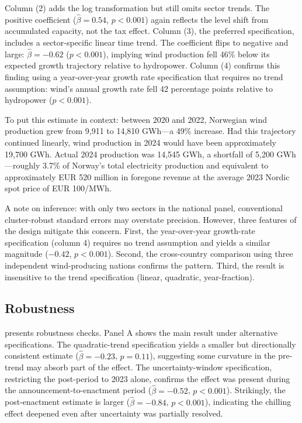 \documentclass[12pt]{article}
\begin{document}
Column (2) adds the log transformation but still omits sector trends. The positive coefficient ($\hat{\beta} = 0.54$, $p < 0.001$) again reflects the level shift from accumulated capacity, not the tax effect. Column (3), the preferred specification, includes a sector-specific linear time trend. The coefficient flips to negative and large: $\hat{\beta} = -0.62$ ($p < 0.001$), implying wind production fell 46\% below its expected growth trajectory relative to hydropower. Column (4) confirms this finding using a year-over-year growth rate specification that requires no trend assumption: wind's annual growth rate fell 42 percentage points relative to hydropower ($p < 0.001$).

To put this estimate in context: between 2020 and 2022, Norwegian wind production grew from 9,911 to 14,810 GWh---a 49\% increase. Had this trajectory continued linearly, wind production in 2024 would have been approximately 19,700 GWh. Actual 2024 production was 14,545 GWh, a shortfall of 5,200 GWh---roughly 3.7\% of Norway's total electricity production and equivalent to approximately EUR 520 million in foregone revenue at the average 2023 Nordic spot price of EUR 100/MWh.

A note on inference: with only two sectors in the national panel, conventional cluster-robust standard errors may overstate precision. However, three features of the design mitigate this concern. First, the year-over-year growth-rate specification (column 4) requires no trend assumption and yields a similar magnitude ($-0.42$, $p < 0.001$). Second, the cross-country comparison using three independent wind-producing nations confirms the pattern. Third, the result is insensitive to the trend specification (linear, quadratic, year-fraction).

\subsection{Robustness}



 presents robustness checks. Panel A shows the main result under alternative specifications. The quadratic-trend specification yields a smaller but directionally consistent estimate ($\hat{\beta} = -0.23$, $p = 0.11$), suggesting some curvature in the pre-trend may absorb part of the effect. The uncertainty-window specification, restricting the post-period to 2023 alone, confirms the effect was present during the announcement-to-enactment period ($\hat{\beta} = -0.52$, $p < 0.001$). Strikingly, the post-enactment estimate is larger ($\hat{\beta} = -0.84$, $p < 0.001$), indicating the chilling effect deepened even after uncertainty was partially resolved.
\end{document}
